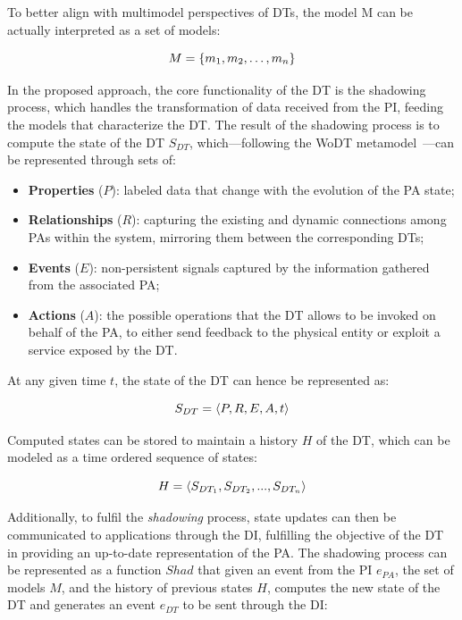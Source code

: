 To better align with multimodel perspectives of \acp{DT}, the model \ac{M} can be actually interpreted as a set of models:

\begin{equation}\label{eq:multi_model}
        M = \{ m_{1}, m_{2}, \dots, m_{n} \} \\
\end{equation}


In the proposed approach, the core functionality of the \ac{DT} is the shadowing process, which handles the transformation of data received from the \ac{PI}, feeding the models that characterize the \ac{DT}.
%
The result of the shadowing process is to compute the state of the \ac{DT} $S_{DT}$, which---following the \ac{WoDT} metamodel~\cite{web-of-dt-ricci-2022}---can be represented through sets of: 
\begin{itemize}
\item \textbf{Properties} ($P$): labeled data that change with the evolution of the \ac{PA} state;
\item \textbf{Relationships} ($R$): capturing the existing and dynamic connections among \acp{PA} within the system, mirroring them between the corresponding \acp{DT}; 
\item \textbf{Events} ($E$): non-persistent signals captured by the information gathered from the associated \ac{PA};
\item \textbf{Actions} ($A$): the possible operations that the \ac{DT} allows to be invoked on behalf of the \ac{PA}, to either send feedback to the physical entity or exploit a service exposed by the \ac{DT}.
\end{itemize}

At any given time $t$, the state of the \ac{DT} can hence be represented as: 

\begin{equation}\label{eq:dt_state}
    S_{DT} = \langle P, R, E, A, t \rangle \\
\end{equation}

Computed states can be stored to maintain a history $H$ of the \ac{DT}, which can be modeled as a time ordered sequence of states:

\begin{equation}\label{eq:dt_history}
        H = \langle S_{DT_1}, S_{DT_2}, ... , S_{DT_n}\rangle\\
\end{equation}

Additionally, to fulfil the \emph{shadowing} process, 
state updates can then be communicated to applications through the \ac{DI}, fulfilling the objective of the \ac{DT} in providing an up-to-date representation of the \ac{PA}.
%
The shadowing process can be represented as a function $Shad$ that given an event from the \ac{PI} $e_{PA}$, the set of models $M$, and the history of previous states $H$, computes the new state of the \ac{DT} and generates an event $e_{DT}$ to be sent through the \ac{DI}:

